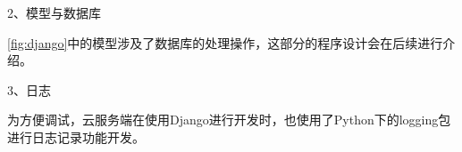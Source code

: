 
2、模型与数据库

\autoref{fig:django}中的模型涉及了数据库的处理操作，这部分的程序设计会在后续进行介绍。

3、日志

为方便调试，云服务端在使用Django进行开发时，也使用了Python下的logging包进行日志记录功能开发\cite{logging}。

